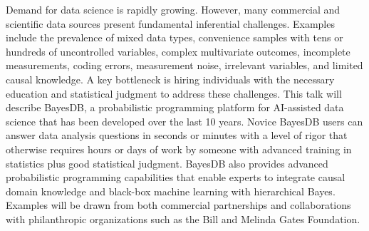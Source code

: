Demand for data science is rapidly growing. However, many
commercial and scientific data sources present fundamental
inferential challenges. Examples include the prevalence of mixed data
types, convenience samples with tens or hundreds of uncontrolled
variables, complex multivariate outcomes, incomplete measurements,
coding errors, measurement noise, irrelevant variables, and limited
causal knowledge. A key bottleneck is hiring individuals with the
necessary education and statistical judgment to address these
challenges.
This talk will describe BayesDB, a probabilistic programming platform
for AI-assisted data science that has been developed over the last 10
years. Novice BayesDB users can answer data analysis questions in
seconds or minutes with a level of rigor that otherwise requires hours
or days of work by someone with advanced training in statistics plus
good statistical judgment. BayesDB also provides advanced
probabilistic programming capabilities that enable experts to
integrate causal domain knowledge and black-box machine learning
with hierarchical Bayes.
Examples will be drawn from both commercial partnerships and
collaborations with philanthropic organizations such as the Bill and
Melinda Gates Foundation.